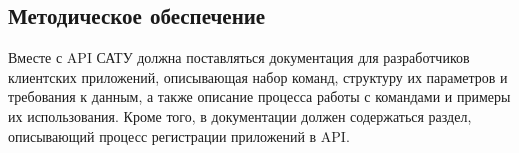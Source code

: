 \subsection{Методическое обеспечение}

\par

	Вместе с API САТУ должна поставляться документация для разработчиков клиентских приложений, описывающая набор команд, структуру их параметров и требования к данным, а также описание процесса работы с командами и примеры их использования. Кроме того, в документации должен содержаться раздел, описывающий процесс регистрации приложений в API.

